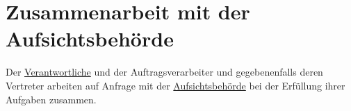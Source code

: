 \chapter{Zusammenarbeit mit der Aufsichtsbehörde}
\label{ch:31}


Der \hyperref[itm:04-7]{Verantwortliche} und der Auftragsverarbeiter und gegebenenfalls deren Vertreter arbeiten auf Anfrage mit der
\hyperref[itm:04-21]{Aufsichtsbehörde} bei der Erfüllung ihrer Aufgaben zusammen.


